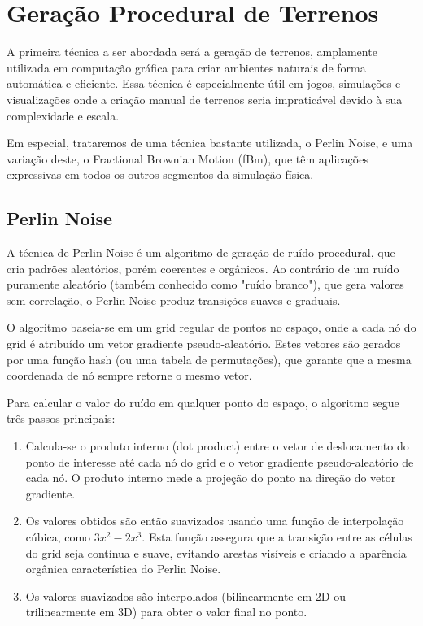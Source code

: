 \section{Geração Procedural de Terrenos}
\label{sec:terrenos}

A primeira técnica a ser abordada será a geração de terrenos, amplamente utilizada em computação gráfica para criar ambientes naturais de forma automática e eficiente. Essa técnica é especialmente útil em jogos, simulações e visualizações onde a criação manual de terrenos seria impraticável devido à sua complexidade e escala.

Em especial, trataremos de uma técnica bastante utilizada, o Perlin Noise, e uma variação deste, o Fractional Brownian Motion (fBm), que têm aplicações expressivas em todos os outros segmentos da simulação física.

\subsection{Perlin Noise}

A técnica de Perlin Noise é um algoritmo de geração de ruído procedural, que cria padrões aleatórios, porém coerentes e orgânicos. Ao contrário de um ruído puramente aleatório (também conhecido como "ruído branco"), que gera valores sem correlação, o Perlin Noise produz transições suaves e graduais.

O algoritmo baseia-se em um grid regular de pontos no espaço, onde a cada nó do grid é atribuído um vetor gradiente pseudo-aleatório. Estes vetores são gerados por uma função hash (ou uma tabela de permutações), que garante que a mesma coordenada de nó sempre retorne o mesmo vetor.

Para calcular o valor do ruído em qualquer ponto do espaço, o algoritmo segue três passos principais:
\begin{enumerate}
    \item Calcula-se o produto interno (dot product) entre o vetor de deslocamento do ponto de interesse até cada nó do grid e o vetor gradiente pseudo-aleatório de cada nó. O produto interno mede a projeção do ponto na direção do vetor gradiente.
    \item Os valores obtidos são então suavizados usando uma função de interpolação cúbica, como $3x^2 - 2x^3$. Esta função assegura que a transição entre as células do grid seja contínua e suave, evitando arestas visíveis e criando a aparência orgânica característica do Perlin Noise.
    \item Os valores suavizados são interpolados (bilinearmente em 2D ou trilinearmente em 3D) para obter o valor final no ponto.
\end{enumerate}

